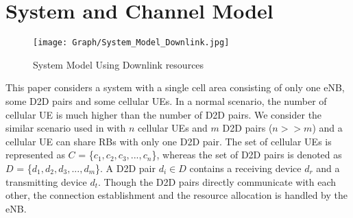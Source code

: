 \documentclass[times]{dacauth}
\begin{document}
\section{System and Channel Model}\label{section:System and Channel Model}

\begin{figure}[t]
	{ %
		\setlength{\fboxsep}{1.5pt}%
		\setlength{\fboxrule}{1.5pt}%
		\centering
		\texttt{[image: Graph/System\_Model\_Downlink.jpg]}
		\caption{System Model Using Downlink resources} \label{fig:system_model}
	}
\end{figure}

%			

\noindent
This paper considers a system with a single cell area consisting of only one eNB, some D2D pairs and some cellular UEs. 
In a normal scenario, the number of cellular UE is much higher than the number of D2D pairs. We consider the similar scenario used in \cite{lora, zulhasnine,  dara} with $n$ cellular UEs and $m$ D2D pairs ($n$$>>$$m$) and a cellular UE can share RBs with only one D2D pair.
The set of cellular UEs is represented as $C$ = \{$ c_{1}, c_{2}, c_{3}, ..., c_{n} $\},  
whereas the set of D2D pairs is denoted as $D$ = \{$ d_{1}, d_{2}, d_{3}, ..., d_{m} $\}. 
A D2D pair $d_{i} \in D$ contains a receiving device $d_{r}$ and a transmitting device $d_{t}$. Though the D2D pairs directly communicate with each other, the connection establishment and the resource allocation is handled by the eNB. 
\end{document}

